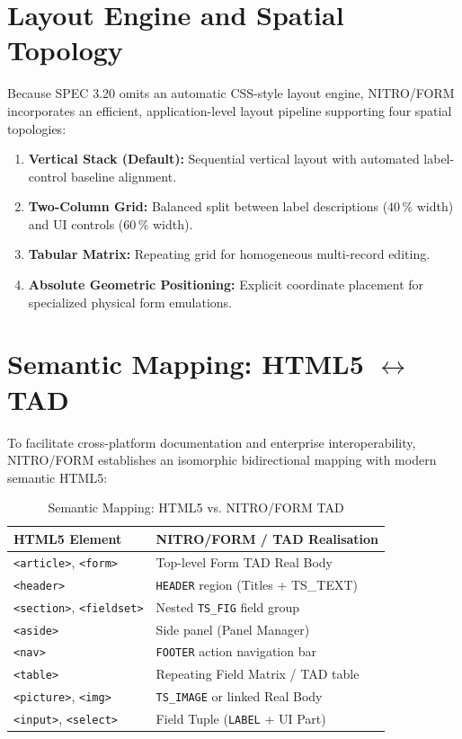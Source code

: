 \documentclass[10pt,journal,compsoc,twocolumn]{article}
\begin{document}
\section{Layout Engine and Spatial Topology}
\label{sec:layout}

Because SPEC 3.20 omits an automatic CSS-style layout engine, NITRO/FORM incorporates an efficient, application-level layout pipeline supporting four spatial topologies:

\begin{enumerate}[leftmargin=*]
    \item \textbf{Vertical Stack (Default):} Sequential vertical layout with automated label-control baseline alignment.
    \item \textbf{Two-Column Grid:} Balanced split between label descriptions ($40\,\%$ width) and UI controls ($60\,\%$ width).
    \item \textbf{Tabular Matrix:} Repeating grid for homogeneous multi-record editing.
    \item \textbf{Absolute Geometric Positioning:} Explicit coordinate placement for specialized physical form emulations.
\end{enumerate}

\section{Semantic Mapping: HTML5 \texorpdfstring{$\leftrightarrow$}{<->} TAD}
\label{sec:semantic_mapping}

To facilitate cross-platform documentation and enterprise interoperability, NITRO/FORM establishes an isomorphic bidirectional mapping with modern semantic HTML5:

\begin{table}[htbp]
\caption{Semantic Mapping: HTML5 vs. NITRO/FORM TAD}
\label{tab:html_mapping}
\centering
\scriptsize
\begin{tabular}{@{}p{3.0cm}p{4.4cm}@{}}
\toprule
\textbf{HTML5 Element} & \textbf{NITRO/FORM / TAD Realisation} \\
\midrule
\texttt{<article>}, \texttt{<form>} & Top-level Form TAD Real Body \\
\texttt{<header>}                   & \texttt{HEADER} region (Titles + TS\_TEXT) \\
\texttt{<section>}, \texttt{<fieldset>} & Nested \texttt{TS\_FIG} field group \\
\texttt{<aside>}                    & Side panel (Panel Manager) \\
\texttt{<nav>}                      & \texttt{FOOTER} action navigation bar \\
\texttt{<table>}                    & Repeating Field Matrix / TAD table \\
\texttt{<picture>}, \texttt{<img>}  & \texttt{TS\_IMAGE} or linked Real Body \\
\texttt{<input>}, \texttt{<select>} & Field Tuple (\texttt{LABEL} + UI Part) \\
\bottomrule
\end{tabular}
\end{table}
\end{document}
